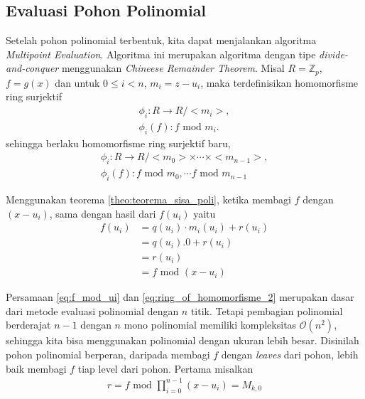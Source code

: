 \subsection{ Evaluasi Pohon Polinomial}
\label{sec:evaluasi_pohon_polinomial}
Setelah pohon polinomial terbentuk, kita dapat menjalankan algoritma \textit{Multipoint Evaluation}. Algoritma ini merupakan algoritma dengan tipe \textit{divide-and-conquer} menggunakan \textit{Chineese Remainder Theorem}. Misal $ R  = \mathbb{Z}_p $, $ f = g(x) $ dan untuk $ 0 \leq i < n $, $ m_i = z - u_i $, maka terdefinisikan homomorfisme ring surjektif 
\begin{equation}
	\begin{aligned}
		\phi_i : R \longrightarrow R/<m_i>, \\
		\phi_i(f) : f \text{ mod } m_i.
	\end{aligned}
\end{equation}
sehingga berlaku homomorfisme ring surjektif baru,
\begin{equation}
	\begin{aligned}
		\phi_i : R \longrightarrow R/<m_0> \times \cdots \times <m_{n-1}>, \\
		\phi_i(f) : f \text{ mod } m_0, \cdots f \text{ mod } m_{n-1} 
	\end{aligned}
	\label{eq:ring_of_homomorfisme_2}
\end{equation}

Menggunakan teorema \ref{theo:teorema_sisa_poli}, ketika membagi $ f $ dengan $ (x - u_i ) $, sama dengan hasil dari $ f(u_i) $ yaitu 
\begin{equation}
	\begin{aligned}
		f(u_i) &= q(u_i) \cdot m_i(u_i) + r(u_i) \\
			   &= q(u_i).0 + r(u_i) \\
			   &= r(u_i) \\
			   &= f \text{ mod } (x - u_i)
	\end{aligned}
	\label{eq:f_mod_ui}
\end{equation}

Persamaan \eqref{eq:f_mod_ui} dan \eqref{eq:ring_of_homomorfisme_2} merupakan dasar dari metode evaluasi polinomial dengan $ n $ titik. Tetapi pembagian polinomial berderajat $ n-1 $ dengan $ n $ mono polinomial memiliki kompleksitas $ \mathcal{O}{(n^2)} $, sehingga kita bisa menggunakan polinomial dengan ukuran lebih besar. Disinilah pohon polinomial berperan, daripada membagi $ f $ dengan \textit{leaves} dari pohon, lebih baik membagi $ f $ tiap level dari pohon. Pertama misalkan
\begin{equation}
	\begin{aligned}
		r = f \text{ mod } \prod_{i=0}^{n-1} (x-u_i) = M_{k,0} \\
	\end{aligned}
\end{equation}

